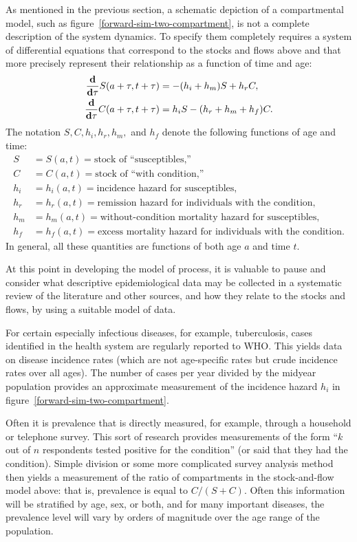 As mentioned in the previous section, a schematic depiction of a
compartmental model, such as figure~\ref{forward-sim-two-compartment},
is not a complete description of the system dynamics.  To specify them
completely requires a system of differential equations
that correspond to the stocks and flows above and that more precisely
represent their relationship as a function of time and age:
\begin{align*}
\frac{\mathbf{d} }{\mathbf{d} \tau} S(a+\tau,t+\tau) &= -(h_i + h_m)S + h_rC,\\
\frac{\mathbf{d}}{\mathbf{d} \tau} C(a+\tau,t+\tau) &= h_iS - (h_r + h_m + h_f)C.\\
\end{align*}
The notation $S,C,h_i,h_r,h_m,$ and $h_f$ denote the
following functions of age and time:
\begin{align*}
S &= S(a,t) = \text{stock of ``susceptibles,''}\\
C &= C(a,t) = \text{stock of ``with condition,''}\\[.1in]
h_i &= h_i(a,t) = \text{incidence hazard for susceptibles},\\
h_r &= h_r(a,t) = \text{remission hazard for individuals with the condition},\\
h_m &= h_m(a,t) = \text{without-condition mortality hazard for susceptibles},\\
h_f &= h_f(a,t) = \text{excess mortality hazard for individuals with the
condition}.
\end{align*}
In general, all these quantities are functions of both age $a$ and
time $t$.

At this point in developing the model of process, it is valuable to
pause and consider what descriptive epidemiological data may be
collected in a systematic review of the literature and other sources,
and how they relate to the stocks and flows,
by using a suitable model of data.

For certain especially infectious diseases, for example, tuberculosis, cases identified in the
health system are regularly reported to WHO.
This yields data on disease
incidence rates (which are not age-specific rates but crude incidence rates
over all ages).  The number of cases per
year divided by the midyear population provides an approximate
measurement of the incidence hazard $h_i$ in figure~\ref{forward-sim-two-compartment}.

Often it is prevalence that is directly measured, for example, through
a household or telephone survey.  This sort of research provides
measurements of the form ``$k$ out of $n$ respondents tested positive
for the condition'' (or said that they had the condition). Simple
division or some more complicated survey analysis method then yields a
measurement of the ratio of compartments in the stock-and-flow model
above: that is, prevalence is equal to $C/(S+C)$.  Often this
information will be stratified by age, sex, or both, and for many
important diseases, the prevalence level will vary by orders of
magnitude over the age range of the population.

